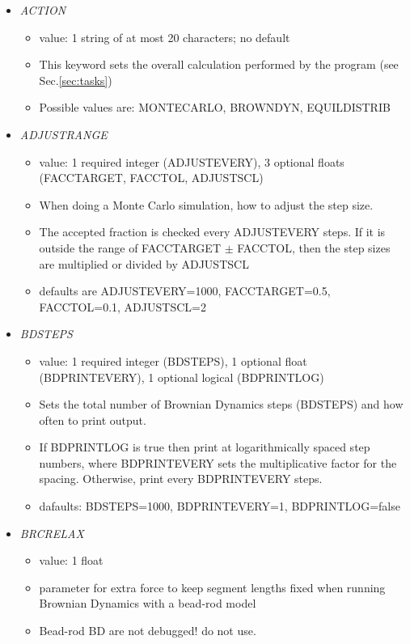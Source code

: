 \documentclass[12pt]{article}
\begin{document}
\begin{itemize}
%
\item {\it ACTION}
  \begin{itemize}
    \item  value: 1 string of at most 20 characters; no default
    \item This keyword sets the overall calculation performed by the program
 (see Sec.\ref{sec:tasks})
    \item Possible values are: MONTECARLO, BROWNDYN, EQUILDISTRIB
  \end{itemize}
%
\item {\it ADJUSTRANGE}
  \begin{itemize}
    \item  value: 1 required integer (ADJUSTEVERY), 3 optional floats (FACCTARGET, FACCTOL, ADJUSTSCL)
    \item When doing a Monte Carlo simulation, how to adjust the step size.
    \item The accepted fraction is checked every ADJUSTEVERY steps. If it is outside the range of FACCTARGET $\pm$ FACCTOL, then the step sizes are multiplied or divided by ADJUSTSCL
    \item defaults are ADJUSTEVERY=1000, FACCTARGET=0.5, FACCTOL=0.1, ADJUSTSCL=2
  \end{itemize}
%
\item {\it BDSTEPS}
  \begin{itemize}
    \item  value: 1 required integer (BDSTEPS), 1 optional float (BDPRINTEVERY), 1 optional logical (BDPRINTLOG)
    \item Sets the total number of Brownian Dynamics steps (BDSTEPS) and how often to print output.
    \item If BDPRINTLOG is true then print at logarithmically spaced step numbers, where BDPRINTEVERY sets the multiplicative factor for the spacing. Otherwise, print every BDPRINTEVERY steps.
    \item dafaults: BDSTEPS=1000, BDPRINTEVERY=1, BDPRINTLOG=false
  \end{itemize}
%
\item {\it BRCRELAX}
  \begin{itemize}
    \item  value: 1 float
    \item parameter for extra force to keep segment lengths fixed when running Brownian Dynamics with a bead-rod model
    \item {\color{red} Bead-rod BD are not debugged! do not use.}

\end{itemize}
\end{itemize}
\end{document}
